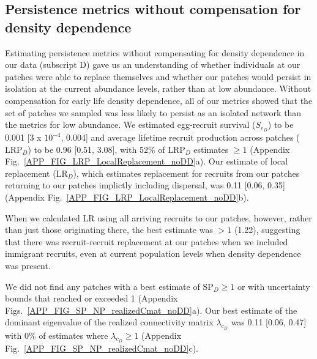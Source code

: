 \documentclass[12pt, oneside]{article}   	%
\begin{document}


\subsection{Persistence metrics without compensation for density dependence} \label{APP_SEC_RESULTS_noDD} %
Estimating persistence metrics without compensating for density dependence in our data (subscript D) gave us an understanding of whether individuals at our patches were able to replace themselves and whether our patches would persist in isolation at the current abundance levels, rather than at low abundance. Without compensation for early life density dependence, all of our metrics showed that the set of patches we sampled was less likely to persist as an isolated network than the metrics for low abundance. We estimated egg-recruit survival ($S_{e_{D}}$) to be 0.001 [3 x $10^{-4}$, 0.004] and average lifetime recruit production across patches ($\text{LRP}_{D}$) to be 0.96 [0.51, 3.08], with 52\% of $\text{LRP}_{D}$ estimates $\geq 1$ (Appendix Fig.\ \ref{APP_FIG_LRP_LocalReplacement_noDD}a). Our estimate of local replacement ($\text{LR}_{D}$), which estimates replacement for recruits from our patches returning to our patches implictly including dispersal, was 0.11 [0.06, 0.35] (Appendix Fig.\ \ref{APP_FIG_LRP_LocalReplacement_noDD}b). 

When we calculated LR using all arriving recruits to our patches, however, rather than just those originating there, the best estimate was $> 1$ (1.22), suggesting that there was recruit-recruit replacement at our patches when we included immigrant recruits, even at current population levels when density dependence was present.

We did not find any patches with a best estimate of $\text{SP}_{D} \geq 1$ or with uncertainty bounds that reached or exceeded 1 (Appendix Figs.\ \ref{APP_FIG_SP_NP_realizedCmat_noDD}a). Our best estimate of the dominant eigenvalue of the realized connectivity matrix $\lambda_{c_{D}}$ was 0.11 [0.06, 0.47] with 0\% of estimates where $\lambda_{c_{D}} \geq 1$ (Appendix Fig.\ \ref{APP_FIG_SP_NP_realizedCmat_noDD}c). 
\end{document}
